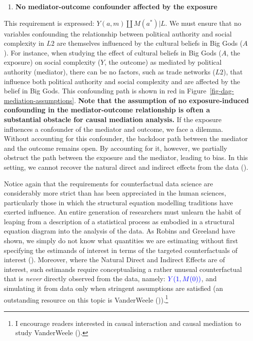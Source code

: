 \documentclass[
  singlecolumn,
  9pt]{article}
\providecommand{\tightlist}{%
  \setlength{\itemsep}{0pt}\setlength{\parskip}{0pt}}\usepackage{longtable,booktabs,array}
\begin{document}
\begin{enumerate}
\def\labelenumi{\arabic{enumi}.}
\setcounter{enumi}{3}
\tightlist
\item
  \textbf{No mediator-outcome confounder affected by the exposure}
\end{enumerate}

This requirement is expressed: \(Y(a,m) \coprod M(a^*) | L\). We must
ensure that no variables confounding the relationship between political
authority and social complexity in \(L2\) are themselves influenced by
the cultural beliefs in Big Gods (\(A\)). For instance, when studying
the effect of cultural beliefs in Big Gods (\(A\), the exposure) on
social complexity (\(Y\), the outcome) as mediated by political
authority (mediator), there can be no factors, such as trade networks
(\(L2\)), that influence both political authority and social complexity
and are affected by the belief in Big Gods. This confounding path is
shown in red in Figure~\ref{fig-dag-mediation-assumptions}. \textbf{Note
that the assumption of no exposure-induced confounding in the
mediator-outcome relationship is often a substantial obstacle for causal
mediation analysis.} If the exposure influences a confounder of the
mediator and outcome, we face a dilemma. Without accounting for this
confounder, the backdoor path between the mediator and the outcome
remains open. By accounting for it, however, we partially obstruct the
path between the exposure and the mediator, leading to bias. In this
setting, we cannot recover the natural direct and indirect effects from
the data ().

Notice again that the requirements for counterfactual data science are
considerably more strict than has been appreciated in the human
sciences, particularly those in which the structural equation modelling
traditions have exerted influence. An entire generation of researchers
must unlearn the habit of leaping from a description of a statistical
process as embodied in a structural equation diagram into the analysis
of the data. As Robins and Greeland have shown, we simply do not know
what quantities we are estimating without first specifying the estimands
of interest in terms of the targeted counterfactuals of interest
(). Moreover, where
the Natural Direct and Indirect Effects are of interest, such estimands
require conceptualising a rather unusual counterfactual that is
\emph{never} directly observed from the data, namely:
\(\textcolor{blue}{Y(1, M(0))}\), and simulating it from data only when
stringent assumptions are satisfied (an outstanding resource on this
topic is VanderWeele ()).\footnote{I
  encourage readers interested in causal interaction and causal
  mediation to study VanderWeele ().}
\end{document}
